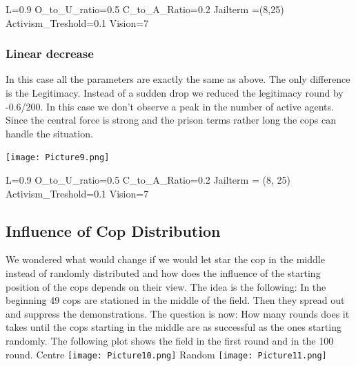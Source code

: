 \documentclass[11pt]{article}
\begin{document}
L=0.9\newline
O\_to\_U\_ratio=0.5\newline
C\_to\_A\_Ratio=0.2\newline
Jailterm =(8,25)\newline
Activism\_Treshold=0.1\newline
Vision=7

\subsubsection{Linear decrease}
In this case all the parameters are exactly the same as above. The only difference is the Legitimacy. Instead of a sudden drop we reduced the legitimacy round by -0.6/200. In this case we don’t observe a peak in the number of active agents. Since the central force is strong and the prison terms rather long the cops can handle the situation.

\texttt{[image: Picture9.png]}

L=0.9\newline
O\_to\_U\_ratio=0.5\newline
C\_to\_A\_Ratio=0.2\newline
Jailterm = (8, 25)\newline
Activism\_Treshold=0.1\newline
Vision=7

\subsection{Influence of Cop Distribution}
We wondered what would change if we would let star the cop in the middle instead of randomly distributed and how does the influence of the starting position of the cops depends on their view.\newline
The idea is the following: In the beginning 49 cops are stationed in the middle of the field. Then they spread out and suppress the demonstrations. The question is now: How many rounds does it takes until the cops starting in the middle are as successful as the ones starting randomly.\newline
The following plot shows the field in the first round and in the 100 round. \newline\newline
Centre\newline\newline
\texttt{[image: Picture10.png]}\newpage
Random\newline\newline
\texttt{[image: Picture11.png]}\newline
\end{document}
